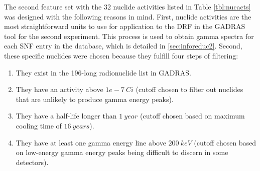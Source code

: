 The second feature set with the 32 nuclide activities listed in Table
\ref{tbl:nucacts} was designed with the following reasons in mind. First,
nuclide activities are the most straightforward units to use for application to
the \gls{DRF} in the \gls{GADRAS} tool for the second experiment. This process
is used to obtain gamma spectra for each \gls{SNF} entry in the database, which
is detailed in \ref{sec:inforeduc2}.  Second, these specific nuclides were
chosen because they fulfill four steps of filtering:
\begin{enumerate}
  \item They exist in the 196-long radionuclide list in \gls{GADRAS}.
  \item They have an activity above $1e-7\:Ci$ (cutoff chosen to filter out
  nuclides that are unlikely to produce gamma energy peaks).
  \item They have a half-life longer than $1\:year$ (cutoff chosen based on
  maximum cooling time of $16\:years$).
  \item They have at least one gamma energy line above $200\:keV$ (cutoff
  chosen based on low-energy gamma energy peaks being difficult to discern in
  some detectors).
\end{enumerate}

